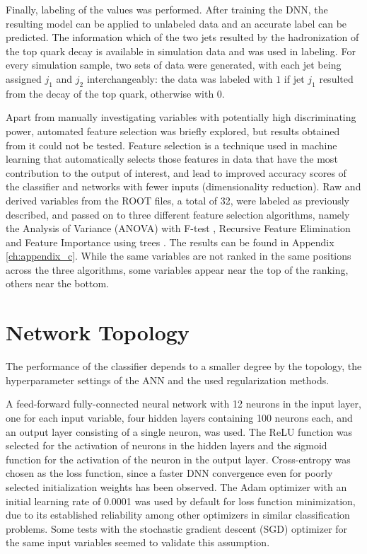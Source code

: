 Finally, labeling of the values was performed. After training the DNN, the resulting model can be applied to unlabeled data and an accurate label can be predicted. The information which of the two jets resulted by the hadronization of the top quark decay is available in simulation data and was used in labeling. For every simulation sample, two sets of data were generated, with each jet being assigned $j_1$ and $j_2$ interchangeably: the data was labeled with $1$ if jet $j_1$ resulted from the decay of the top quark, otherwise with $0$.

Apart from manually investigating variables with potentially high discriminating power, automated feature selection was briefly explored, but results obtained from it could not be tested. Feature selection is a technique used in machine learning that automatically selects those features in data that have the most contribution to the output of interest, and lead to improved accuracy scores of the classifier and networks with fewer inputs (dimensionality reduction). Raw and derived variables from the ROOT files, a total of 32, were labeled as previously described, and passed on to three different feature selection algorithms, namely the Analysis of Variance (ANOVA) with F-test \cite{misc:anova}, Recursive Feature Elimination \cite{scikit-learn} and Feature Importance using trees \cite{scikit-learn}. The results can be found in Appendix \ref{ch:appendix_c}. While the same variables are not ranked in the same positions across the three algorithms, some variables appear near the top of the ranking, others near the bottom.

\section{Network Topology}
\label{sec:ch-4-network}

The performance of the classifier depends to a smaller degree by the topology, the hyperparameter settings of the ANN and the used regularization methods.

A feed-forward fully-connected neural network with 12 neurons in the input layer, one for each input variable, four hidden layers containing 100 neurons each, and an output layer consisting of a single neuron, was used. The ReLU function was selected for the activation of neurons in the hidden layers and the sigmoid function for the activation of the neuron in the output layer. Cross-entropy was chosen as the loss function, since a faster DNN convergence even for poorly selected initialization weights has been observed. The Adam optimizer with an initial learning rate of 0.0001 was used by default for loss function minimization, due to its established reliability among other optimizers in similar classification problems. Some tests with the stochastic gradient descent (SGD) optimizer for the same input variables seemed to validate this assumption.

